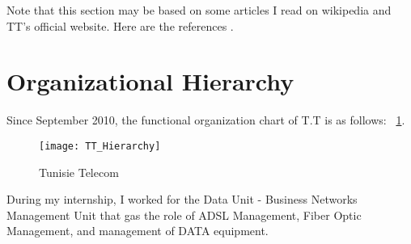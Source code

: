 

Note that this section may be based on some articles I read on wikipedia and TT's official website.  Here are the references \citep{TT2019, WikiTT2019}.

\section{Organizational Hierarchy}
Since September 2010, the functional organization chart of T.T is as follows: ~\ref{fig:test1}.


\begin{figure}[ht!] %
  \centering
  \texttt{[image: TT\_Hierarchy]}
  \caption[TT Hierarchy]{Tunisie Telecom }%
  \label{fig:test1}
\end{figure}

During my internship, I worked for the Data Unit - Business Networks Management Unit that gas the role of ADSL Management, Fiber Optic Management, and management of DATA equipment.





